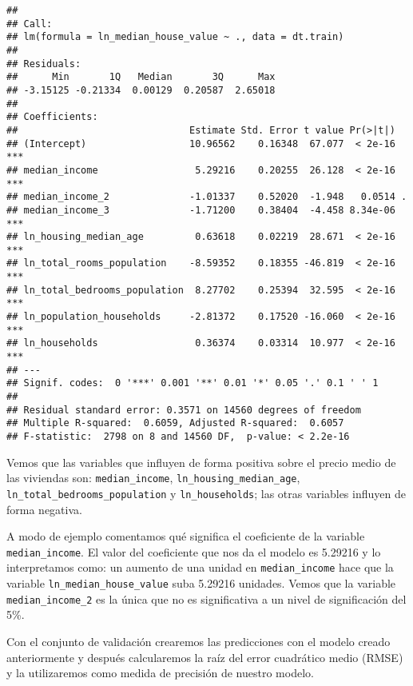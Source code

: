 \documentclass[
]{article}
\newenvironment{Shaded}{\begin{snugshade}}{\end{snugshade}}
\newcommand{\DataTypeTok}[1]{\textcolor[rgb]{0.13,0.29,0.53}{#1}}
\newcommand{\KeywordTok}[1]{\textcolor[rgb]{0.13,0.29,0.53}{\textbf{#1}}}
\newcommand{\NormalTok}[1]{#1}
\newcommand{\OperatorTok}[1]{\textcolor[rgb]{0.81,0.36,0.00}{\textbf{#1}}}
\newcommand{\StringTok}[1]{\textcolor[rgb]{0.31,0.60,0.02}{#1}}
\begin{document}
\begin{verbatim}
## 
## Call:
## lm(formula = ln_median_house_value ~ ., data = dt.train)
## 
## Residuals:
##      Min       1Q   Median       3Q      Max 
## -3.15125 -0.21334  0.00129  0.20587  2.65018 
## 
## Coefficients:
##                              Estimate Std. Error t value Pr(>|t|)    
## (Intercept)                  10.96562    0.16348  67.077  < 2e-16 ***
## median_income                 5.29216    0.20255  26.128  < 2e-16 ***
## median_income_2              -1.01337    0.52020  -1.948   0.0514 .  
## median_income_3              -1.71200    0.38404  -4.458 8.34e-06 ***
## ln_housing_median_age         0.63618    0.02219  28.671  < 2e-16 ***
## ln_total_rooms_population    -8.59352    0.18355 -46.819  < 2e-16 ***
## ln_total_bedrooms_population  8.27702    0.25394  32.595  < 2e-16 ***
## ln_population_households     -2.81372    0.17520 -16.060  < 2e-16 ***
## ln_households                 0.36374    0.03314  10.977  < 2e-16 ***
## ---
## Signif. codes:  0 '***' 0.001 '**' 0.01 '*' 0.05 '.' 0.1 ' ' 1
## 
## Residual standard error: 0.3571 on 14560 degrees of freedom
## Multiple R-squared:  0.6059, Adjusted R-squared:  0.6057 
## F-statistic:  2798 on 8 and 14560 DF,  p-value: < 2.2e-16
\end{verbatim}

Vemos que las variables que influyen de forma positiva sobre el precio
medio de las viviendas son: \texttt{median\_income},
\texttt{ln\_housing\_median\_age},
\texttt{ln\_total\_bedrooms\_population} y \texttt{ln\_households}; las
otras variables influyen de forma negativa.

A modo de ejemplo comentamos qué significa el coeficiente de la variable
\texttt{median\_income}. El valor del coeficiente que nos da el modelo
es 5.29216 y lo interpretamos como: un aumento de una unidad en
\texttt{median\_income} hace que la variable
\texttt{ln\_median\_house\_value} suba 5.29216 unidades. Vemos que la
variable \texttt{median\_income\_2} es la única que no es significativa
a un nivel de significación del 5\%.

Con el conjunto de validación crearemos las predicciones con el modelo
creado anteriormente y después calcularemos la raíz del error cuadrático
medio (RMSE) y la utilizaremos como medida de precisión de nuestro
modelo.

\begin{Shaded}
\end{Shaded}
\end{document}
